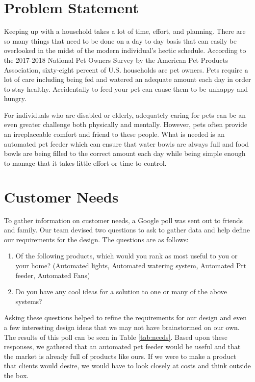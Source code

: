 \documentclass[notitlepage,11pt]{article}
\begin{document}
    \section{Problem Statement}

        Keeping up with a household takes a lot of time, effort, and planning. There are so many things that need to be 
        done on a day to day basis that can easily be overlooked in the midst of the modern individual's hectic schedule. 
        According to the 2017-2018 National Pet Owners Survey by the American Pet Products Association, sixty-eight 
        percent of U.S. households are pet owners. Pets require a lot of care including being fed and watered an 
        adequate amount each day in order to stay healthy. Accidentally to feed your pet can cause them to be unhappy 
        and hungry.

        For individuals who are disabled or elderly, adequately caring for pets can be an even greater challenge both 
        physically and mentally. However, pets often provide an irreplaceable comfort and friend to these people. What 
        is needed is an automated pet feeder which can ensure that water bowls are always full and food bowls are being 
        filled to the correct amount each day while being simple enough to manage that it takes little effort or time 
        to control.
        
    \section{Customer Needs}

        To gather information on customer needs, a Google poll was sent out to friends and family. Our team devised two 
        questions to ask to gather data and help define our requirements for the design. The questions are as follows:

        \begin{enumerate}
            \item Of the following products, which would you rank as most useful to you or your home? 
            (Automated lights, Automated watering system, Automated Prt feeder, Automated Fans)
            \item Do you have any cool ideas for a solution to one or many of the above systems?
        \end{enumerate}

        Asking these questions helped to refine the requirements for our design and even a few interesting design ideas 
        that we may not have brainstormed on our own. The results of this poll can be seen in Table \ref{tab:needs}. 
        Based upon these responses, we gathered that an automated pet feeder would be useful and that the market is 
        already full of products like ours. If we were to make a product that clients would desire, we would have to 
        look closely at costs and think outside the box.
        
\end{document}
